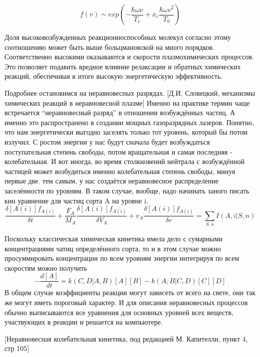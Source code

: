 \documentclass[10pt, a4paper]{article}
\begin{document}
\begin{equation}
  f(v) \sim exp(-\frac{\hbar \omega \nu} {T_v}+x_e\frac{\hbar \omega \nu^{2}}{T_0})
\end{equation}

Доля высоковозбужденных реакционноспособных молекул согласно этому соотношению может быть выше больцмановской на много порядков. Соответственно высокими оказываются и скорости плазмохимических процессов. Это позволяет подавить вредное влияние релаксации и обратных химических реакций, обеспечивая в итоге высокую энергетическую эффективность. 

Подробнее остановимся на неравновесных разрядах. [Д.И. Словецкий, механизмы химических реакций в неравновесной плазме]
Именно на практике термин чаще встречается “неравновесный разряд” в отношении возбуждённых частиц. А именно это распространено в создании мощных газоразрядных лазеров. Понятно, что нам энергетически выгодно заселять только тот уровень, который бы потом излучил. С ростом энергии у нас будут сначала будет возбуждаться поступательная степень свободы, потом вращательная и самая последняя - колебательная. И вот иногда, во время столкновений нейтрала с возбуждённой частицей может возбудиться именно колебательная степень свободы, минуя первые две. тем самым, у нас создаётся неравновесное распределение заселённости по уровням.
В таком случае, вообще, надо начинать заного писать кин уравнение для частиц сорта A на уровне i.
\begin{equation}
\frac{\delta [A(i)] f_{A(i)}}{\delta t}+\frac{F_A}{M_A}\frac{\delta [A(i)] f_{A(i)}}{\delta V_A} +v_A \frac{\delta [A(i)] f_{A(i)}}{\delta r}=\sum_{S,n} I(A,i|S,n) 
\end{equation}

Поскольку классическая химическая кинетика имела дело с сумарными концентрациями чатиц определённого сорта, то и в этом случае можно просуммировать концентрации по всем уровням энергии интегрируя по всем скоростям можно получить
 \begin{equation}
-\frac{d [A] }{dt}=k(C,D|A,B) [A][B]-k(A,B|C,D) [C][D]
\end{equation}
В общем случае коэффициенты реакции могут зависеть от всего на свете, они так же могут иметь пороговый характер. И для описания неравновесных процессов обычно выписываются все уравнения для основных уровней всех веществ, участвующих в реакции и решается на компьютере.

[Неравновесная колебательная кинетика, под редакцией М. Капителли, пункт 4, стр 105]
\end{document}

